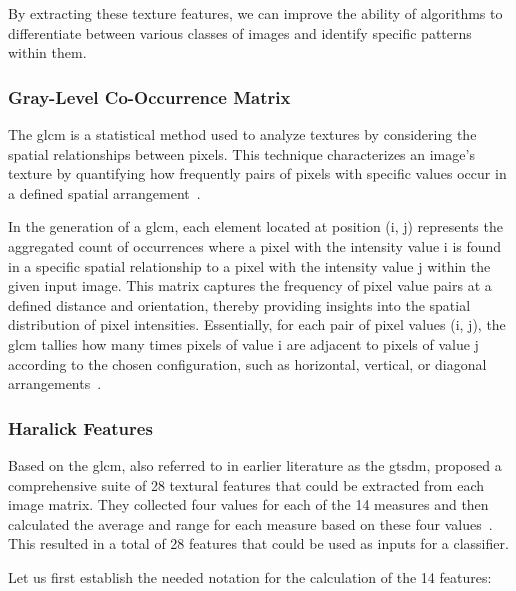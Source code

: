 By extracting these texture features, we can improve the ability of algorithms to differentiate between various classes of images and identify specific patterns within them. 

\subsubsection{Gray-Level Co-Occurrence Matrix}
The \acf{glcm} is a statistical method used to analyze textures by considering the spatial relationships between pixels. This technique characterizes an image's texture by quantifying how frequently pairs of pixels with specific values occur in a defined spatial arrangement~\cite{zulpe_glcm_2012}.

In the generation of a \ac{glcm}, each element located at position (i, j) represents the aggregated count of occurrences where a pixel with the intensity value i is found in a specific spatial relationship to a pixel with the intensity value j within the given input image. This matrix captures the frequency of pixel value pairs at a defined distance and orientation, thereby providing insights into the spatial distribution of pixel intensities. Essentially, for each pair of pixel values (i, j), the \ac{glcm} tallies how many times pixels of value i are adjacent to pixels of value j according to the chosen configuration, such as horizontal, vertical, or diagonal arrangements~\cite{zulpe_glcm_2012}.

\subsubsection{Haralick Features}
Based on the \ac{glcm}, also referred to in earlier literature as the \acf{gtsdm}, \textcite{haralick_textural_1973} proposed a comprehensive suite of 28 textural features that could be extracted from each image matrix. They collected four values for each of the 14 measures and then calculated the average and range for each measure based on these four values~\cite{haralick_textural_1973, zulpe_glcm_2012}. This resulted in a total of 28 features that could be used as inputs for a classifier. 

Let us first establish the needed notation for the calculation of the 14 features:

